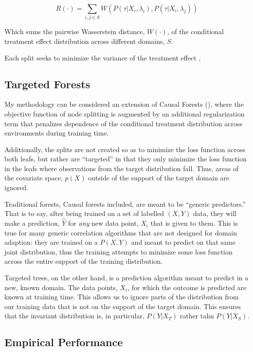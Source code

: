 \documentclass[a4paper,12pt]{article}
\begin{document}
$$
R(\cdot) = \sum_{i,j \in S} W(P(\tau | X_i, \lambda_i),P(\tau | X_i, \lambda_j))
$$

Which sums the pairwise Wasserstein distance, $W(\cdot)$, of the conditional treatment effect distribution across different domains, $S$.


Each split seeks to minimize the variance of the treatment effect ,



\subsection*{Targeted Forests}

My methodology can be considered an extension of Causal Forests (\cite{}), where the objective function of node splitting is augmented by an additional regularization term that penalizes dependence of the conditional treatment distribution across environments during training time. 

Additionally, the splits are not created so as to minimize the loss function across both leafs, but rather are ``targeted'' in that they only minimize the loss function in the leafs where observations from the target distribution fall. Thus, areas of the covariate space, $p(X)$ outside of the support of the target domain are ignored. 

Traditional forests, Causal forests included, are meant to be ``generic predictors.'' That is to say, after being trained on a set of labelled $(X,Y)$ data, they will make a prediction, $\hat{Y}$ for \textit{any} new data point, $X_i$ that is given to them. This is true for many generic correlation algorithms that are not designed for domain adaption: they are trained on a $P(X,Y)$ and meant to predict on that same joint distribution, thus the training attempts to minimize some loss function across the entire support of the training distribution. 

Targeted trees, on the other hand, is a prediction algorithm meant to predict in a new, known domain. The data points, $X_i$, for which the outcome is predicted are known at training time. This allows us to ignore parts of the distribution from our training data that is not on the support of the target domain. This ensures that the invariant distribution is, in particular, $P(Y|X_T)$ rather tahn $P(Y|X_S)$. 





\subsection*{Empirical Performance}
\end{document}
